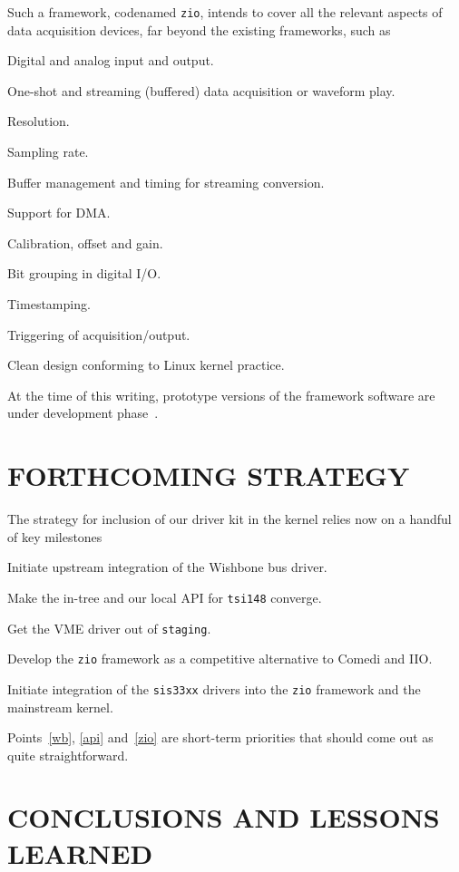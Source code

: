 \documentclass{JAC2003}
\begin{document}
Such a framework, codenamed \texttt{zio}, intends to cover all the relevant
aspects of data acquisition devices, far beyond the existing frameworks,
such as
\begin{Itemize}
\item Digital and analog input and output.
\item One-shot and streaming (buffered) data acquisition or waveform play.
\item Resolution.
\item Sampling rate.
\item Buffer management and timing for streaming conversion.
\item Support for DMA.
\item Calibration, offset and gain.
\item Bit grouping in digital I/O.
\item Timestamping.
\item Triggering of acquisition/output.
\item Clean design conforming to Linux kernel practice.
\end{Itemize}
At the time of this writing, prototype versions of the framework software
are under development phase~\cite{zio-git}.

\section{FORTHCOMING STRATEGY}

The strategy for inclusion of our driver kit in the kernel relies now on a
handful of key milestones
\begin{Enumerate}
\item Initiate upstream integration of the Wishbone bus driver.
	\label{wb}
\item Make the in-tree and our local API for \verb|tsi148| converge.
	\label{api}
\item Get the VME driver out of \texttt{staging}.
\item Develop the \texttt{zio} framework as a competitive alternative
	to Comedi and IIO.
	\label{zio}
\item Initiate integration of the \texttt{sis33xx} drivers into the
    \texttt{zio} framework and the mainstream kernel.
\end{Enumerate}
Points~\ref{wb}, \ref{api} and~\ref{zio} are short-term priorities that
should come out as quite straightforward.

\section{CONCLUSIONS AND LESSONS LEARNED}
\end{document}
